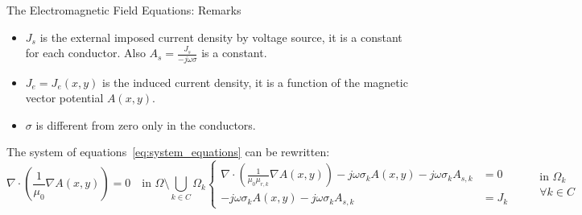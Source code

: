 \documentclass[aspectratio=54,xcolor=dvipsnames]{beamer}
\begin{document}
\begin{frame}{The Electromagnetic Field Equations: Remarks}
    \begin{footnotesize}
    \begin{itemize}[]
        \item $J_s$ is the external imposed current density by voltage source, it is a constant for each conductor. Also $A_s = \frac{J_s}{- j \omega \sigma}$ is a constant.
        \item $J_e = J_e(x,y)$ is the induced current density, it is a function of the magnetic vector potential $A(x,y)$.
        \item $\sigma$ is different from zero only in the conductors.  
    \end{itemize}
    The system of equations~\eqref{eq:system_equations} can be rewritten:
    \begin{subequations}
    \begin{equation}
        \nabla \cdot \left( \frac{1}{\mu_0} \nabla A(x,y) \right)  = 0 \quad \text{in } \Omega \setminus \bigcup_{k \in C} \Omega_k
    \end{equation}
    \begin{equation}
        \left\{
        \begin{aligned}
        \nabla \cdot \left( \frac{1}{\mu_0\mu_{r,k}} \nabla A(x,y) \right) - j\omega \sigma_k A(x,y) - j\omega \sigma_k A_{s,k} &= 0 
        \\[1em]
        - j\omega \sigma_k A(x,y) - j\omega \sigma_k A_{s,k} &= J_k 
        \end{aligned}
        \right.
        \qquad             
        \begin{array}{l}
            \text{in } \Omega_k \\
            \forall k \in C
        \end{array}
    \end{equation}
    \end{subequations}
    \end{footnotesize}
\end{frame}
\end{document}
